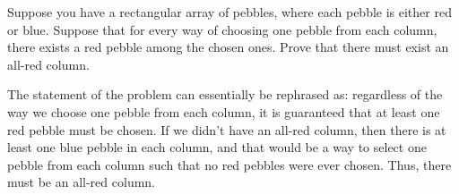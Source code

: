 \documentclass[11pt]{article}
\begin{document}

Suppose you have a rectangular array of pebbles, where each pebble is either red or blue. Suppose that for every way of choosing one pebble from each column, there exists a red pebble among the chosen ones. Prove that there must exist an all-red column.

\begin{solution}
    The statement of the problem can essentially be rephrased as: regardless of the way we choose one pebble from each column, it is guaranteed that at least one red pebble must be chosen. If we didn't have an all-red column, then there is at least one blue pebble in each column, and that would be a way to select one pebble from each column such that no red pebbles were ever chosen. Thus, there must be an all-red column.
\end{solution}

\end{document}
